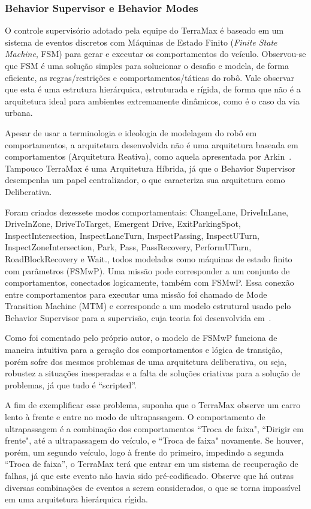 \subsubsection{Behavior Supervisor e Behavior Modes}

O controle supervisório adotado pela equipe do TerraMax é baseado em um sistema de
eventos discretos com Máquinas de Estado Finito (\textit{Finite State Machine},
FSM) para gerar e executar os comportamentos do veículo. Observou-se que FSM é
uma solução simples para solucionar o desafio e modela, de forma eficiente, as
regras/restrições e comportamentos/táticas do robô. Vale observar que esta é uma
estrutura hierárquica, estruturada e rígida, de forma que não é a arquitetura
ideal para ambientes extremamente dinâmicos, como é o caso da via urbana.

Apesar de usar a terminologia e ideologia de modelagem do robô em
comportamentos, a arquitetura desenvolvida não é uma arquitetura baseada em
comportamentos (Arquitetura Reativa), como aquela apresentada por
Arkin~\cite{arkin1998behavior}. Tampouco TerraMax é uma Arquitetura
Híbrida, já que o Behavior Supervisor desempenha um papel centralizador, o que
caracteriza sua arquitetura como Deliberativa.

Foram criados dezessete modos comportamentais: ChangeLane, DriveInLane,
DriveInZone, DriveToTarget, Emergent Drive, ExitParkingSpot,
InspectIntersection, InspectLaneTurn, InspectPassing, InspectUTurn,
InspectZoneIntersection, Park, Pass, PassRecovery, PerformUTurn,
RoadBlockRecovery e Wait., todos modelados como máquinas de estado finito
com parâmetros (FSMwP). Uma missão pode corresponder a um conjunto de
comportamentos, conectados logicamente, também com FSMwP. Essa conexão entre
comportamentos para executar uma missão foi chamado de Mode Transition Machine
(MTM) e corresponde a um modelo estrutural usado pelo Behavior Supervisor para a
supervisão, cuja teoria foi desenvolvida em~\cite{chen2001safety}.

Como foi comentado pelo próprio autor, o modelo de FSMwP funciona de maneira
intuitiva para a geração dos comportamentos e lógica de transição, porém sofre
dos mesmos problemas de uma arquitetura deliberativa, ou seja, robustez a
situações inesperadas e a falta de soluções criativas para a solução de
problemas, já que tudo é ``scripted''.

A fim de exemplificar esse problema, suponha que o TerraMax observe um carro
lento à frente e entre no modo de ultrapassagem. O comportamento de
ultrapassagem é a combinação dos comportamentos ``Troca de faixa", ``Dirigir
em frente", até a ultrapassagem do veículo, e ``Troca de faixa" novamente. Se
houver, porém, um segundo veículo, logo à frente do primeiro, impedindo a
segunda ``Troca de faixa'', o TerraMax terá que entrar em um sistema de
recuperação de falhas, já que este evento não havia sido pré-codificado. Observe
que há outras diversas combinações de eventos a serem considerados, o que se
torna impossível em uma arquitetura hierárquica rígida.

